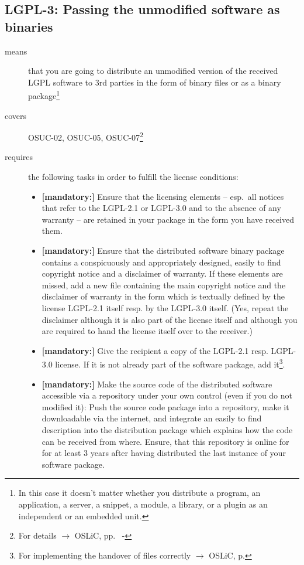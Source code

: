 \subsection{LGPL-3: Passing the unmodified software as binaries} 

\begin{description}
\item[means] that you are going to distribute an unmodified version of the
received LGPL software to 3rd parties in the form of binary files or as a
bi\-na\-ry package\footnote{In this case it doesn't matter whether you 
distribute a program, an application, a server, a snippet, a module, a library,
or a plugin as an independent or an embedded unit.}

\item[covers] OSUC-02, OSUC-05, OSUC-07\footnote{For details $\rightarrow$ OSLiC, pp.\
\pageref{OSUC-02-DEF} - \pageref{OSUC-07-DEF}}

\item[requires] the following tasks in order to fulfill the license conditions:
\begin{itemize}
  
  \item \textbf{[mandatory:]} Ensure that the licensing elements -- esp.\ all
  notices that refer to the LGPL-2.1 or LGPL-3.0 and to the absence of any
  warranty -- are retained in your package in the form you have received them.

  \item \textbf{[mandatory:]} Ensure that the distributed software binary
  package contains a conspicuously and appropriately designed, easily to find
  copyright notice and a disclaimer of warranty. If these elements are missed,
  add a new file containing the main copyright notice and the disclaimer of
  warranty in the form which is textually defined by the license LGPL-2.1 itself
  resp. by the LGPL-3.0 itself. (Yes, repeat the disclaimer although it is also
  part of the license itself and although you are required to hand the license
  itself over to the receiver.)
  
  \item \textbf{[mandatory:]} Give the recipient a copy of the LGPL-2.1 resp.
  LGPL-3.0 license. If it is not already part of the software package, add
  it\footnote{For implementing the handover of files correctly $\rightarrow$
  OSLiC, p. \pageref{DistributingFilesHint}}.
  
  \item \textbf{[mandatory:]} Make the source code of the distributed software
  accessible via a repository under your own control (even if you do not
  modified it): Push the source code package into a repository, make it
  downloadable via the internet, and integrate an easily to find description
  into the distribution package which explains how the code can be received from
  where. Ensure, that this repository is online for for at least 3 years after
  having distributed the last instance of your software package.
  

\end{itemize}
\end{description}
